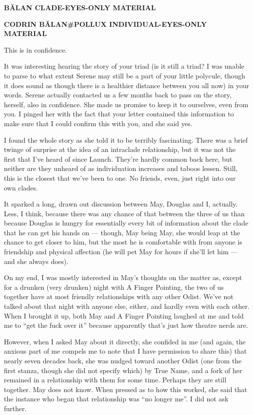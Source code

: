 \textbf{BĂLAN CLADE-EYES-ONLY MATERIAL}

\textbf{CODRIN BĂLAN\#POLLUX INDIVIDUAL-EYES-ONLY MATERIAL}

This is in confidence.

It was interesting hearing the story of your triad (is it still a triad? I was unable to parse to what extent Serene may still be a part of your little polycule, though it does sound as though there is a healthier distance between you all now) in your words. Serene actually contacted us a few months back to pass on the story, herself, also in confidence. She made us promise to keep it to ourselves, even from you. I pinged her with the fact that your letter contained this information to make sure that I could confirm this with you, and she said yes.

I found the whole story as she told it to be terribly fascinating. There was a brief twinge of surprise at the idea of an intraclade relationship, but it was not the first that I've heard of since Launch. They're hardly common back here, but neither are they unheard of as individuation increases and taboos lessen. Still, this is the closest that we've been to one. No friends, even, just right into our own clades.

It sparked a long, drawn out discussion between May, Douglas and I, actually. Less, I think, because there was any chance of that between the three of us than because Douglas is hungry for essentially every bit of information about the clade that he can get his hands on — though, May being May, she would leap at the chance to get closer to him, but the most he is comfortable with from anyone is friendship and physical affection (he will pet May for hours if she'll let him — and she always does).

On my end, I was mostly interested in May's thoughts on the matter as, except for a drunken (very drunken) night with A Finger Pointing, the two of us together have at most friendly relationships with any other Odist. We've not talked about that night with anyone else, either, and hardly even with each other. When I brought it up, both May and A Finger Pointing laughed at me and told me to ``get the fuck over it'' because apparently that's just how theatre nerds are.

However, when I asked May about it directly, she confided in me (and again, the anxious part of me compels me to note that I have permission to share this) that nearly seven decades back, she was nudged toward another Odist (one from the first stanza, though she did not specify which) by True Name, and a fork of her remained in a relationship with them for some time. Perhaps they are still together. May does not know. When pressed as to how this worked, she said that the instance who began that relationship was ``no longer me''. I did not ask further.

